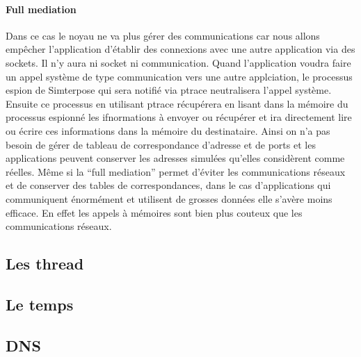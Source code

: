 \paragraph{Full mediation} 
Dans ce cas le noyau ne va plus gérer des communications car nous allons
empêcher l'application d'établir des connexions avec une autre application via
des sockets. Il n'y aura ni socket ni communication. Quand l'application voudra
faire un appel système de type communication vers une autre applciation, le
processus espion de Simterpose qui sera notifié via ptrace neutralisera l'appel
système. Ensuite ce processus en utilisant ptrace récupérera en lisant dans la
mémoire du processus espionné les ifnormations à envoyer ou récupérer et ira
directement lire ou écrire ces informations dans la mémoire du
destinataire. Ainsi on n'a pas besoin de gérer de tableau de correspondance
d'adresse et de ports et les applications peuvent conserver les adresses
simulées qu'elles considèrent comme réelles.  Même si la ``full mediation''
permet d'éviter les communications réseaux et de conserver des tables de
correspondances, dans le cas d'applications qui communiquent énormément et
utilisent de grosses données elle s'avère moins efficace. En effet les appels à
mémoires sont bien plus couteux que les communications réseaux.

\subsection{Les thread}

\subsection{Le temps}

\subsection{DNS}
